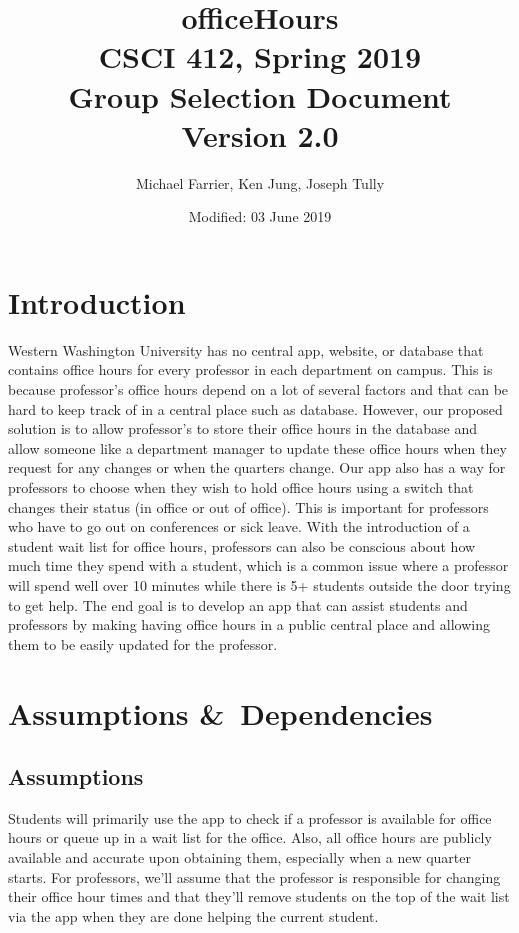 \documentclass[11pt]{article} %
\begin{document}
\title{officeHours\\ CSCI 412, Spring 2019\\ Group Selection Document \\ Version 2.0}
\author{Michael Farrier, Ken Jung, Joseph Tully}
\date{Modified: 03 June 2019}
\maketitle

\section{Introduction}

Western Washington University has no central app, website, or database that contains office hours for every professor in each department on campus. This is because professor's office hours depend on a lot of several factors and that can be hard to keep track of in a central place such as database. However, our proposed solution is to allow professor's to store their office hours in the database and allow someone like a department manager to update these office hours when they request for any changes or when the quarters change. Our app also has a way for professors to choose when they wish to hold office hours using a switch that changes their status (in office or out of office). This is important for professors who have to go out on conferences or sick leave. With the introduction of a student wait list for office hours, professors can also be conscious about how much time they spend with a student, which is a common issue where a professor will spend well over 10 minutes while there is 5+ students outside the door trying to get help. The end goal is to develop an app that can assist students and professors by making having office hours in a public central place and allowing them to be easily updated for the professor.

\section{Assumptions \&\ Dependencies}

\subsection{Assumptions}
Students will primarily use the app to check if a professor is available for office hours or queue up in a wait list for the office. Also, all office hours are publicly available and accurate upon obtaining them, especially when a new quarter starts. For professors, we'll assume that the professor is responsible for changing their office hour times and that they'll remove students on the top of the wait list via the app when they are done helping the current student. \\
\end{document}
